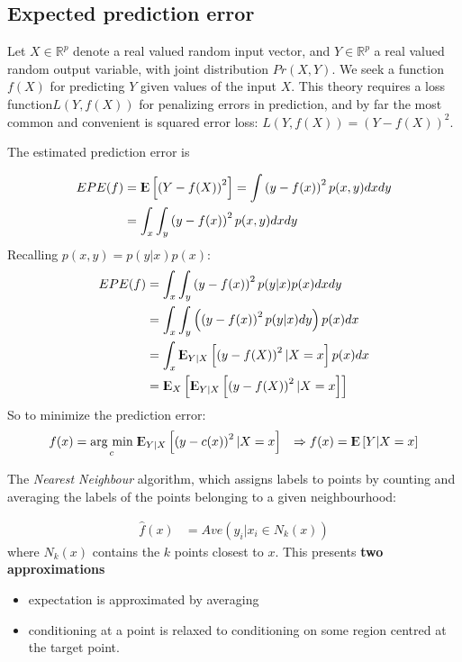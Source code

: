 \documentclass[12pt, letterpaper]{article}
\theoremstyle{definition}
\newcommand{\R}{\mathbb{R}}
\newcommand{\E}{{\rm I\kern-.3em E}}
\newcommand{\argmin}[1]{\underset{#1}{\operatorname{arg}\,\operatorname{min}}\;}
\begin{document}
\subsection{Expected prediction error}
Let $X \in \R^p$ denote a real valued random input vector, and $Y \in \R^p$ a real valued random output variable, with joint distribution $Pr(X,Y)$. We seek a function $f(X)$ for predicting $Y$ given values of the input $X$. This theory requires a loss function$ L(Y,f(X))$ for penalizing errors in prediction, and by far the most common and convenient is 
squared error loss: $L(Y,f(X))=(Y -f(X))^2$.

The estimated prediction error is 

\begin{align}
EPE(f) &= \E\left[ \left( Y- f(X) \right)^2 \right] = \int \left( y- f(x) \right)^2 p(x,y) dx dy \\
&= \int_x\int_y \left( y- f(x) \right)^2 p(x,y) dx dy \\
\end{align}
Recalling $p(x,y) = p( y|x) p(x)$:
\begin{align}
EPE(f) &= \int_x\int_y \left( y- f(x) \right)^2 p(y|x)  p(x) dx dy \\
 &= \int_x \int_y \left( \left( y - f(x) \right)^2 p(y|x) dy\right)  p(x) dx   \\
 &= \int_x \E_{Y|X} \left[ \left( y - f(X) \right)^2 | X=x \right]  p(x) dx   \\
 &= \E_X \left[ \E_{Y|X} \left[ \left( y - f(X) \right)^2 | X=x \right]    \right]   
\end{align}
So to minimize the prediction error:
\begin{align}
f(x) &= \argmin{c} \E_{Y|X} \left[ \left( y - c(x) \right)^2 | X=x \right] 
& \Rightarrow f(x) = \E \left[ Y | X=x \right] 
\end{align}

The \textit{Nearest Neighbour} algorithm, which assigns labels to points by counting and averaging the labels of the points belonging to a given neighbourhood:

\begin{align}
\hat{f} (x) &= Ave \left(   y_i|x_i \in N_k(x)   \right)
\end{align}
where $N_k(x) $ contains the $k$ points closest to $x$. This presents \textbf{two approximations}
\begin{itemize}
\item expectation is approximated by averaging
\item conditioning at a point is relaxed to conditioning on some region centred at the target point.
\end{itemize}
\end{document}
